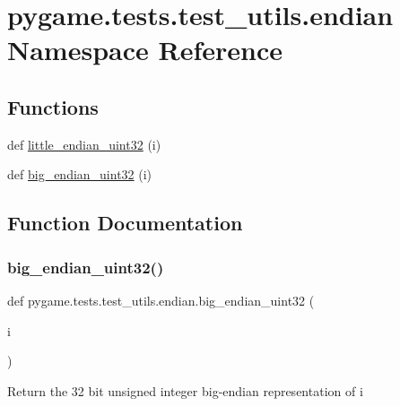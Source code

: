 \hypertarget{namespacepygame_1_1tests_1_1test__utils_1_1endian}{}\section{pygame.\+tests.\+test\+\_\+utils.\+endian Namespace Reference}
\label{namespacepygame_1_1tests_1_1test__utils_1_1endian}
\subsection*{Functions}
\begin{DoxyCompactItemize}
\item 
def \hyperlink{namespacepygame_1_1tests_1_1test__utils_1_1endian_a212d6c63282f7a731e0d77dcc77b53e1}{little\+\_\+endian\+\_\+uint32} (i)
\item 
def \hyperlink{namespacepygame_1_1tests_1_1test__utils_1_1endian_a9e80ae38702b1be8c0432cc3c3a12934}{big\+\_\+endian\+\_\+uint32} (i)
\end{DoxyCompactItemize}


\subsection{Function Documentation}
\mbox{\label{namespacepygame_1_1tests_1_1test__utils_1_1endian_a9e80ae38702b1be8c0432cc3c3a12934}} 
\subsubsection{\texorpdfstring{big\+\_\+endian\+\_\+uint32()}{big\_endian\_uint32()}}
{\footnotesize\ttfamily def pygame.\+tests.\+test\+\_\+utils.\+endian.\+big\+\_\+endian\+\_\+uint32 (\begin{DoxyParamCaption}\item[{}]{i }\end{DoxyParamCaption})}

\begin{DoxyVerb}Return the 32 bit unsigned integer big-endian representation of i\end{DoxyVerb}
 \mbox{\label{namespacepygame_1_1tests_1_1test__utils_1_1endian_a212d6c63282f7a731e0d77dcc77b53e1}} 
